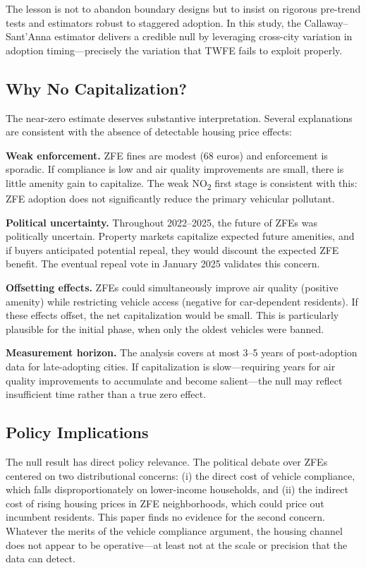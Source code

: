 \documentclass[12pt]{article}
\begin{document}
The lesson is not to abandon boundary designs but to insist on rigorous pre-trend tests and estimators robust to staggered adoption. In this study, the Callaway--Sant'Anna estimator delivers a credible null by leveraging cross-city variation in adoption timing---precisely the variation that TWFE fails to exploit properly.

\subsection{Why No Capitalization?}

The near-zero estimate deserves substantive interpretation. Several explanations are consistent with the absence of detectable housing price effects:

\textbf{Weak enforcement.} ZFE fines are modest (68 euros) and enforcement is sporadic. If compliance is low and air quality improvements are small, there is little amenity gain to capitalize. The weak NO\textsubscript{2} first stage is consistent with this: ZFE adoption does not significantly reduce the primary vehicular pollutant.

\textbf{Political uncertainty.} Throughout 2022--2025, the future of ZFEs was politically uncertain. Property markets capitalize expected future amenities, and if buyers anticipated potential repeal, they would discount the expected ZFE benefit. The eventual repeal vote in January 2025 validates this concern.

\textbf{Offsetting effects.} ZFEs could simultaneously improve air quality (positive amenity) while restricting vehicle access (negative for car-dependent residents). If these effects offset, the net capitalization would be small. This is particularly plausible for the initial phase, when only the oldest vehicles were banned.

\textbf{Measurement horizon.} The analysis covers at most 3--5 years of post-adoption data for late-adopting cities. If capitalization is slow---requiring years for air quality improvements to accumulate and become salient---the null may reflect insufficient time rather than a true zero effect.

\subsection{Policy Implications}

The null result has direct policy relevance. The political debate over ZFEs centered on two distributional concerns: (i) the direct cost of vehicle compliance, which falls disproportionately on lower-income households, and (ii) the indirect cost of rising housing prices in ZFE neighborhoods, which could price out incumbent residents. This paper finds no evidence for the second concern. Whatever the merits of the vehicle compliance argument, the housing channel does not appear to be operative---at least not at the scale or precision that the data can detect.
\end{document}
